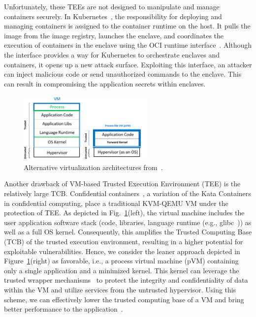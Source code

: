 Unfortunately, these TEEs are not designed to manipulate and manage containers securely. In Kubernetes~\cite*{k8s}, the responsibility for deploying and managing containers is assigned to the container runtime on the host. It pulls the image from the image registry, launches the enclave, and coordinates the 
execution of containers in the enclave using the OCI runtime interface~\cite*{oci-runtime-spec}. Although the interface provides a way for Kubernetes to orchestrate enclaves and containers, it opens up a new attack surface. Exploiting this interface, an attacker can inject malicious code or send unauthorized commands to 
the enclave. This can result in compromising the application secrets within enclaves.
 
 
\begin{figure}[!htb]
  \centering
  \includegraphics[width=0.6\textwidth]{images/VM_vs_PVM.png}
  \caption[Alternative virtualization architectures.]{Alternative virtualization architectures from~\cite*{10.1145/3436512}.}
  \label{fig:VM_vs_PVM}
\end{figure}
 
Another drawback of VM-based Trusted Execution Environment (TEE) is the relatively large TCB. Confidential containers~\cite*{confidential_kata}, a variation of the Kata Containers in confidential computing, place a traditional KVM-QEMU VM under the protection of TEE. As depicted in Fig.~\ref{fig:VM_vs_PVM}(left), the virtual machine includes the 
user application software stack (code, libraries, language runtime (e.g., glibc~\cite*{glibc})) as well as a full OS kernel. Consequently, this amplifies the Trusted Computing Base (TCB) of the trusted execution environment, resulting in a higher potential for exploitable vulnerabilities. Hence, we consider 
the leaner approach depicted in Figure~\ref{fig:VM_vs_PVM}(right) as favorable, i.e., a process virtual machine (pVM) containing only a single application and a minimized kernel. This kernel can leverage the trusted wrapper mechanisms~\cite*{Hoekstra2013UsingII} to protect the integrity and confidentiality of data within the VM and utilize services 
from the untrusted hypervisor. Using this scheme, we can effectively lower the trusted computing base of a VM and bring better performance to the application~\cite*{quark_performance_report}.
 

